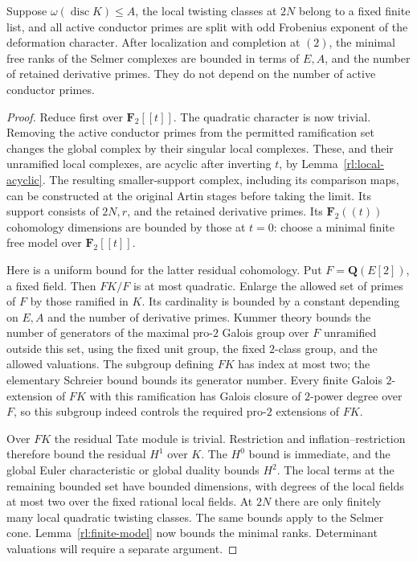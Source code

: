 \begin{lemma}\label{rl:residual-bound}
Suppose $\omega(\operatorname{disc}K)\leq A$, the local twisting classes
at $2N$ belong to a fixed finite list, and all active conductor primes
are split with odd Frobenius exponent of the deformation character.  After localization and completion at
$(2)$, the minimal free ranks of the Selmer complexes are bounded in
terms of $E,A$, and the number of retained derivative primes.  They do
not depend on the number of active conductor primes.
\end{lemma}

\begin{proof}
Reduce first over $\mathbf F_2[[t]]$.  The quadratic character is now
trivial.  Removing the active conductor primes from the permitted
ramification set changes the global complex by their singular local
complexes.  These, and their unramified local complexes, are acyclic
after inverting $t$, by Lemma~\ref{rl:local-acyclic}.  The resulting
smaller-support complex, including its comparison maps, can be
constructed at the original Artin stages before taking the limit.
Its support consists of $2N,r$, and the retained derivative primes.
Its $\mathbf F_2((t))$ cohomology dimensions are bounded by those at
$t=0$: choose a minimal finite free model over $\mathbf F_2[[t]]$.

Here is a uniform bound for the latter residual cohomology.  Put
$F=\mathbf Q(E[2])$, a fixed field.  Then $FK/F$ is at most quadratic.
Enlarge the allowed set of primes of $F$ by those ramified in $K$.
Its cardinality is bounded by a constant depending on $E,A$ and the
number of derivative primes.  Kummer theory bounds the number of
generators of the maximal pro-$2$ Galois group over $F$ unramified
outside this set, using the fixed unit group, the fixed $2$-class group,
and the allowed valuations.  The subgroup defining $FK$ has index at
most two; the elementary Schreier bound bounds its generator number.
Every finite Galois $2$-extension of $FK$ with this ramification has
Galois closure of $2$-power degree over $F$, so this subgroup indeed
controls the required pro-$2$ extensions of $FK$.

Over $FK$ the residual Tate module is trivial.  Restriction and
inflation--restriction therefore bound the residual $H^1$ over $K$.
The $H^0$ bound is immediate, and the global Euler characteristic or
global duality bounds $H^2$.  The local terms at the remaining bounded
set have bounded dimensions, with degrees of the local fields at most
two over the fixed rational local fields.  At $2N$ there are only
finitely many local quadratic twisting classes.  The same bounds
apply to the Selmer cone.  Lemma~\ref{rl:finite-model} now bounds the
minimal ranks. Determinant valuations will require a separate argument.
\end{proof}

